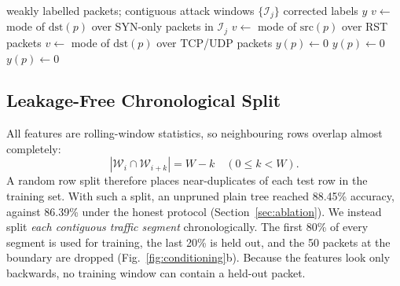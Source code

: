 \documentclass[conference]{IEEEtran}
\begin{document}
\begin{algorithm}[t]
\caption{Direction-aware relabelling}
\label{alg:relabel}
\begin{algorithmic}[1]
\Require weakly labelled packets; contiguous attack windows $\{\mathcal{I}_j\}$
\Ensure corrected labels $y$
  \State $v\gets$ mode of $\mathrm{dst}(p)$ over SYN-only packets in $\mathcal{I}_j$
   \State $v\gets$ mode of $\mathrm{src}(p)$ over RST packets
  \EndIf
   \State $v\gets$ mode of $\mathrm{dst}(p)$ over TCP/UDP packets
  \EndIf
     \State $y(p)\gets 0$ 
     \State $y(p)\gets 0$ 
     \State $y(p)\gets 0$
    \EndIf
  \EndFor
\EndFor
\end{algorithmic}
\end{algorithm}

\subsection{Leakage-Free Chronological Split}
All features are rolling-window statistics, so neighbouring rows overlap almost completely:
\begin{equation}
  |\mathcal{W}_i\cap\mathcal{W}_{i+k}| = W-k \quad (0\le k<W).
\end{equation}
A random row split therefore places near-duplicates of each test row in the training set. With such a split, an unpruned plain tree reached 88.45\% accuracy, against 86.39\% under the honest protocol (Section~\ref{sec:ablation}). We instead split \emph{each contiguous traffic segment} chronologically. The first 80\% of every segment is used for training, the last 20\% is held out, and the 50 packets at the boundary are dropped (Fig.~\ref{fig:conditioning}b). Because the features look only backwards, no training window can contain a held-out packet.
\end{document}

